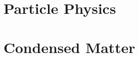 \documentclass[12pt,oneside]{book}
\begin{document}


\newpage


	

\part{Particle Physics}

	
	
	
	
	
%	
	
\part{Condensed Matter}

	
	
	
	
%	
	
	
%	
	
%	

	

	
\end{document}
